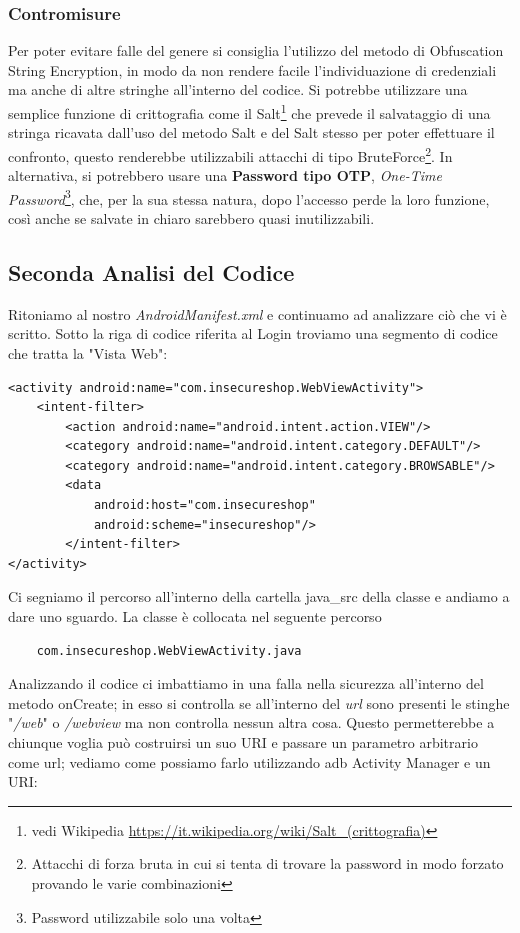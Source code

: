 \documentclass{article}
\begin{document}
\subsubsection*{Contromisure}
Per poter evitare falle del genere si consiglia l'utilizzo del metodo di Obfuscation String Encryption, in modo da non rendere facile l'individuazione 
di credenziali ma anche di altre stringhe all'interno del codice. Si potrebbe
utilizzare una semplice funzione di crittografia come il Salt\footnote{ vedi Wikipedia \url{https://it.wikipedia.org/wiki/Salt_(crittografia)}} 
che prevede il salvataggio di una stringa ricavata dall'uso del metodo Salt e del Salt stesso per poter 
effettuare il confronto, questo renderebbe utilizzabili attacchi di tipo
BruteForce\footnote{Attacchi di forza bruta in cui si tenta di trovare la password in modo forzato provando le varie combinazioni}.
In alternativa, si potrebbero usare una \textbf{ Password tipo OTP}, \textit{One-Time Password}\footnote{Password utilizzabile solo una volta}, 
che, per la sua stessa natura, dopo 
l'accesso perde la loro funzione, così anche se salvate in chiaro sarebbero quasi inutilizzabili.
\subsection{Seconda Analisi del Codice}

Ritoniamo al nostro \emph{AndroidManifest.xml} e continuamo ad analizzare ciò che vi è scritto.
Sotto la riga di codice riferita al Login troviamo una segmento di codice che tratta la "Vista Web":
\begin{verbatim}
<activity android:name="com.insecureshop.WebViewActivity">
    <intent-filter>
        <action android:name="android.intent.action.VIEW"/>
        <category android:name="android.intent.category.DEFAULT"/>
        <category android:name="android.intent.category.BROWSABLE"/>
        <data 
            android:host="com.insecureshop" 
            android:scheme="insecureshop"/>
        </intent-filter>
</activity>  
\end{verbatim}
Ci segniamo il percorso all'interno della cartella java\_src della classe e andiamo a dare uno sguardo. La classe è collocata 
nel seguente percorso
\begin{verbatim}
    com.insecureshop.WebViewActivity.java
\end{verbatim}

Analizzando il codice ci imbattiamo in una falla nella sicurezza all'interno del metodo onCreate; in esso si controlla se 
all'interno del \textit{url} sono presenti le stinghe "\textit{/web}" o \textit{/webview} ma non controlla nessun altra cosa. 
Questo permetterebbe a chiunque voglia può costruirsi un suo URI e passare un parametro arbitrario come url; vediamo come possiamo farlo utilizzando 
adb Activity Manager e un URI:
\end{document}
